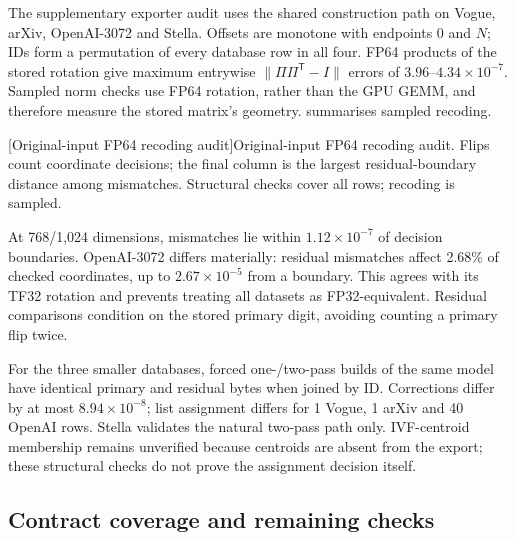 The supplementary exporter audit uses the shared construction path on
Vogue, arXiv, OpenAI-3072 and Stella. Offsets are monotone with endpoints
0 and $N$; IDs form a permutation of every database row in all four.
FP64 products of the stored rotation give maximum entrywise
$\|\Pi\Pi^{\mathsf T}-I\|$ errors of $3.96$--$4.34\times10^{-7}$.
Sampled norm checks use FP64 rotation, rather than the GPU GEMM, and
therefore measure the stored matrix's geometry.
 summarises sampled recoding.

\par\medskip\noindent\begin{minipage}{\linewidth}
\centering\captionsetup{hypcap=false}
[Original-input FP64 recoding audit]{Original-input FP64 recoding audit. Flips count coordinate
decisions; the final column is the largest residual-boundary distance
among mismatches. Structural checks cover all rows; recoding is sampled.}
\label{tab:4-representation-audit}
\scriptsize\setlength{\tabcolsep}{3pt}

\end{minipage}\par\medskip

At 768/1,024 dimensions, mismatches lie within $1.12\times10^{-7}$ of
decision boundaries. OpenAI-3072 differs materially: residual mismatches
affect 2.68\% of checked coordinates, up to $2.67\times10^{-5}$ from a
boundary. This agrees with its TF32 rotation and prevents treating all
datasets as FP32-equivalent. Residual comparisons condition on the stored
primary digit, avoiding counting a primary flip twice.

For the three smaller databases, forced one-/two-pass builds of the same
model have identical primary and residual bytes when joined by ID.
Corrections differ by at most $8.94\times10^{-8}$; list assignment differs
for 1 Vogue, 1 arXiv and 40 OpenAI rows. Stella validates the natural
two-pass path only. IVF-centroid membership remains unverified because
centroids are absent from the export; these structural checks do not
prove the assignment decision itself.

\subsection{Contract coverage and remaining checks}
\suppressfloats[t]

